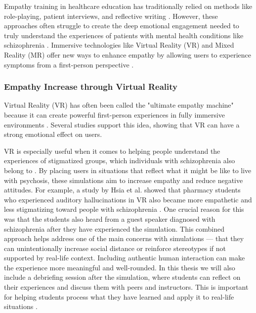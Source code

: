 Empathy training in healthcare education has traditionally relied on methods like role-playing, patient interviews, and reflective writing \cite{Batt-Rawden2013}. However, these approaches often struggle to create the deep emotional engagement needed to truly understand the experiences of patients with mental health conditions like schizophrenia \cite{Hsia2022, Formosa2018}. Immersive technologies like Virtual Reality (VR) and Mixed Reality (MR) offer new ways to enhance empathy by allowing users to experience symptoms from a first-person perspective \cite{Krogmeier2024, Silva2017}.

\subsubsection{Empathy Increase through Virtual Reality}

Virtual Reality (VR) has often been called the "ultimate empathy machine" because it can create powerful first-person experiences in fully immersive environments \cite{Milk2015}. Several studies support this idea, showing that VR can have a strong emotional effect on users.

VR is especially useful when it comes to helping people understand the experiences of stigmatized groups, which individuals with schizophrenia also belong to \cite{Formosa2018, Marques2022, Mattsson2024}. By placing users in situations that reflect what it might be like to live with psychosis, these simulations aim to increase empathy and reduce negative attitudes. For example, a study by Hsia et al. showed that pharmacy students who experienced auditory hallucinations in VR also became more empathetic and less stigmatizing toward people with schizophrenia \cite{Hsia2022}. One crucial reason for this was that the students also heard from a guest speaker diagnosed with schizophrenia after they have experienced the simulation. This combined approach helps address one of the main concerns with simulations — that they can unintentionally increase social distance or reinforce stereotypes if not supported by real-life context. Including authentic human interaction can make the experience more meaningful and well-rounded. In this thesis we will also include a debriefing session after the simulation, where students can reflect on their experiences and discuss them with peers and instructors. This is important for helping students process what they have learned and apply it to real-life situations \cite{Hsia2022}.

\vspace{1em}

